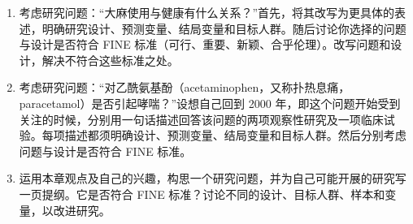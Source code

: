 \begin{enumerate}
\item 考虑研究问题：“大麻使用与健康有什么关系？”首先，将其改写为更具体的表述，明确研究设计、预测变量、结局变量和目标人群。随后讨论你选择的问题与设计是否符合 FINE 标准（可行、重要、新颖、合乎伦理）。改写问题和设计，解决不符合这些标准之处。
\item 考虑研究问题：“对乙酰氨基酚（acetaminophen，又称扑热息痛，paracetamol）是否引起哮喘？”设想自己回到 2000 年，即这个问题开始受到关注的时候，分别用一句话描述回答该问题的两项观察性研究及一项临床试验。每项描述都须明确设计、预测变量、结局变量和目标人群。然后分别考虑问题与设计是否符合 FINE 标准。
\item 运用本章观点及自己的兴趣，构思一个研究问题，并为自己可能开展的研究写一页提纲。它是否符合 FINE 标准？讨论不同的设计、目标人群、样本和变量，以改进研究。
\end{enumerate}
